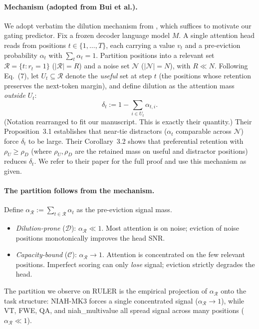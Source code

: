 \paragraph{Mechanism (adopted from Bui et al.).}
We adopt verbatim the dilution mechanism from \citet{arxiv260509649}, which
suffices to motivate our gating predictor. Fix a frozen decoder language
model $M$. A single
attention head reads from positions $t \in \{1, \dots, T\}$, each carrying
a value $v_t$ and a pre-eviction probability $\alpha_t$ with $\sum_t
\alpha_t = 1$. Partition positions into a relevant set $\mathcal{R} = \{t:
r_t = 1\}$ ($|\mathcal{R}| = R$) and a noise set $\mathcal{N}$
($|\mathcal{N}| = N$), with $R \ll N$. Following \citet{arxiv260509649}
Eq.~(7), let $U_t \subseteq \mathcal{R}$ denote the \emph{useful} set at
step $t$ (the positions whose retention preserves the next-token margin),
and define dilution as the attention mass \emph{outside} $U_t$:
\begin{equation}
\label{eq:dilution}
\delta_t := 1 - \sum_{i \in U_t} \alpha_{t,i}.
\end{equation}
(Notation rearranged to fit our manuscript. This is exactly their
quantity.) Their Proposition~3.1 establishes that near-tie distractors
($\alpha_t$ comparable across $\mathcal{N}$) force $\delta_t$ to be large.
Their Corollary~3.2 shows that preferential retention with $\rho_U \geq
\rho_D$ (where $\rho_U, \rho_D$ are the retained mass on useful and
distractor positions) reduces $\delta_t$. We refer to their paper for the
full proof and use this mechanism as given.

\paragraph{The partition follows from the mechanism.}
Define $\alpha_{\mathcal{R}} := \sum_{t \in \mathcal{R}} \alpha_t$ as the
pre-eviction signal mass.
\begin{itemize}
  \item \emph{Dilution-prone} ($\mathcal{D}$): $\alpha_{\mathcal{R}} \ll 1$.
  Most attention is on noise; eviction of noise positions monotonically
  improves the head SNR.
  \item \emph{Capacity-bound} ($\mathcal{C}$): $\alpha_{\mathcal{R}} \to 1$.
  Attention is concentrated on the few relevant positions. Imperfect
  scoring can only \emph{lose} signal; eviction strictly degrades the
  head.
\end{itemize}
The partition we observe on RULER is the empirical projection of
$\alpha_{\mathcal{R}}$ onto the task structure: NIAH-MK3 forces a
single concentrated signal ($\alpha_{\mathcal{R}} \to 1$), while VT, FWE,
QA, and niah\_multivalue all spread signal across many positions
($\alpha_{\mathcal{R}} \ll 1$).

